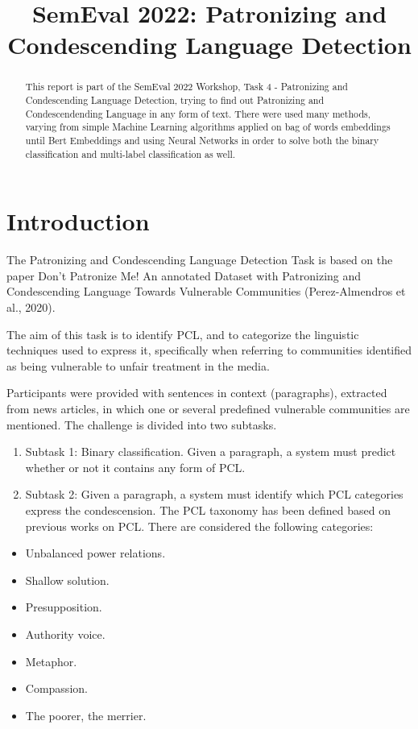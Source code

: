 \documentclass[11pt]{article}
\begin{document}
\title{SemEval 2022: Patronizing and Condescending Language Detection}
\date{}
\author{}
\maketitle

\begin{abstract}
This report is part of the SemEval 2022 Workshop, Task 4 - Patronizing and
Condescending Language Detection, trying to find out Patronizing and
Condescendending Language in any form of text. There were used many methods,
varying from simple Machine Learning algorithms applied on bag of words
embeddings until Bert Embeddings and using Neural Networks in order to solve
both the binary classification and multi-label classification as well.
\end{abstract}

\section{Introduction}

The Patronizing and Condescending Language Detection Task is based on the
paper Don't Patronize Me! An annotated Dataset with Patronizing and
Condescending Language Towards Vulnerable Communities (Perez-Almendros et
al., 2020).

The aim of this task is to identify PCL, and to categorize the linguistic
techniques used to express it, specifically when referring to communities
identified as being vulnerable to unfair treatment in the media.

Participants were provided with sentences in context (paragraphs), extracted
from news articles, in which one or several predefined vulnerable
communities are mentioned. The challenge is divided into two subtasks.

\begin{enumerate}
\item Subtask 1: Binary classification. Given a paragraph, a system must
predict whether or not it contains any form of PCL.

\item Subtask 2: Given a paragraph, a system must identify which PCL
categories express the condescension. The PCL taxonomy has been defined
based on previous works on PCL. There are considered the following
categories:
\end{enumerate}

\begin{itemize}
\item Unbalanced power relations.

\item Shallow solution.

\item Presupposition.

\item Authority voice.

\item Metaphor.

\item Compassion.

\item The poorer, the merrier.
\end{itemize}
\end{document}

